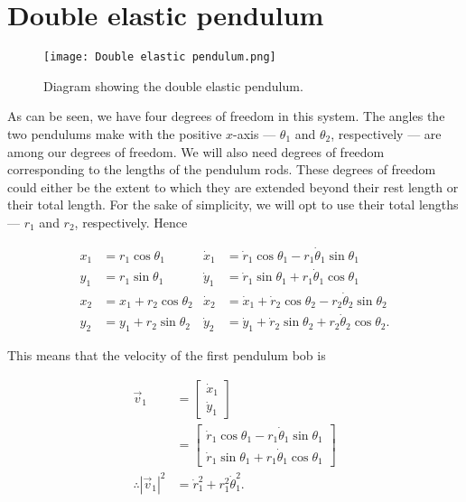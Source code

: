 \documentclass[12pt,a4paper,portrait]{article}
\begin{document}
\section{Double elastic pendulum}
\begin{figure}[H]
	\texttt{[image: Double elastic pendulum.png]}
	\caption{Diagram showing the double elastic pendulum.}
\end{figure}

As can be seen, we have four degrees of freedom in this system. The angles the two pendulums make with the positive $x$-axis --- $\theta_1$ and $\theta_2$, respectively --- are among our degrees of freedom. We will also need degrees of freedom corresponding to the lengths of the pendulum rods. These degrees of freedom could either be the extent to which they are extended beyond their rest length or their total length. For the sake of simplicity, we will opt to use their total lengths --- $r_1$ and $r_2$, respectively. Hence

\begin{align*}
	x_1 &= r_1 \cos{\theta_1} & \dot{x}_1 &= \dot{r}_1 \cos{\theta_1} - r_1 \dot{\theta}_1 \sin{\theta_1}\\
	y_1 &= r_1 \sin{\theta_1} & \dot{y}_1 &= \dot{r}_1\sin{\theta_1} + r_1\dot{\theta}_1 \cos{\theta_1} \\
	x_2 &= x_1 + r_2\cos{\theta_2} & \dot{x}_2 &= \dot{x}_1 + \dot{r}_2\cos{\theta_2} - r_2\dot{\theta}_2 \sin{\theta_2} \\
	y_2 &= y_1 + r_2\sin{\theta_2} & \dot{y}_2 &= \dot{y}_1 + \dot{r}_2\sin{\theta_2} + r_2\dot{\theta}_2 \cos{\theta_2}.
\end{align*}

This means that the velocity of the first pendulum bob is

\begin{align*}
	\vec{v}_1 &= \begin{bmatrix}
		\dot{x}_1 \\
		\dot{y}_1
	\end{bmatrix} \\
	&= \begin{bmatrix}
		\dot{r}_1 \cos{\theta_1} - r_1 \dot{\theta}_1 \sin{\theta_1} \\
		\dot{r}_1\sin{\theta_1} + r_1\dot{\theta}_1 \cos{\theta_1}
	\end{bmatrix} \\
	\therefore |\vec{v}_1|^2 &= \dot{r}_1^2 + r_1^2 \dot{\theta}_1^2. 
\end{align*}
\end{document}
